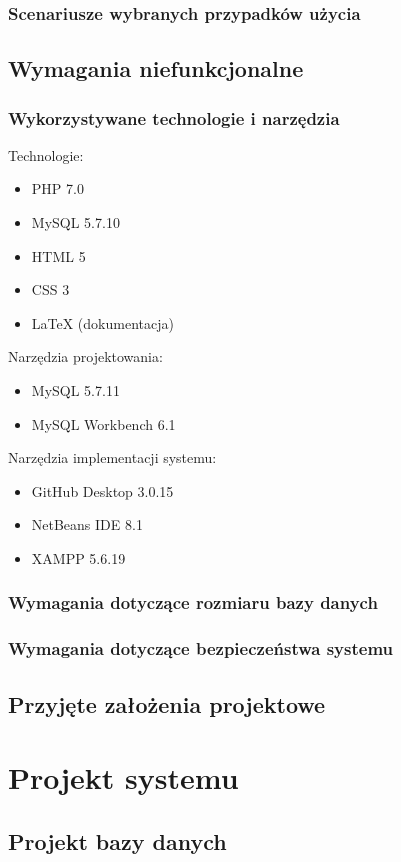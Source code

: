 \documentclass[a4paper, 12pt]{article}
\begin{document}
\subsubsection{Scenariusze wybranych przypadków użycia}

\subsection{Wymagania niefunkcjonalne}
\subsubsection{Wykorzystywane technologie i narzędzia}
Technologie:
\begin{itemize}
	\item PHP 7.0
	\item MySQL 5.7.10
	\item HTML 5
	\item CSS 3
	\item LaTeX (dokumentacja)
\end{itemize}
Narzędzia projektowania:
\begin{itemize}
	\item MySQL 5.7.11
	\item MySQL Workbench 6.1
\end{itemize}
Narzędzia implementacji systemu:
\begin{itemize}
	\item GitHub Desktop 3.0.15
	\item NetBeans IDE 8.1
	\item XAMPP 5.6.19
\end{itemize}
\subsubsection{Wymagania dotyczące rozmiaru bazy danych}
\subsubsection{Wymagania dotyczące bezpieczeństwa systemu}
\subsection{Przyjęte założenia projektowe}

\section{Projekt systemu}
\subsection{Projekt bazy danych}
\end{document}

